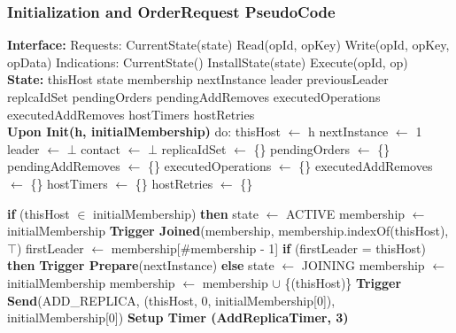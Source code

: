\documentclass[sigconf]{acmart}
\begin{document}
\subsubsection{Initialization and OrderRequest PseudoCode}
\begin{algorithmic}[1]
\small
\State \textbf{Interface:}
\State \quad Requests:
\State \quad \quad CurrentState(state)
\State \quad \quad Read(opId, opKey)
\State \quad \quad Write(opId, opKey, opData)
\State \quad Indications:
\State \quad \quad CurrentState()
\State \quad \quad InstallState(state)
\State \quad \quad Execute(opId, op)\\

\State \textbf{State:}
\State \quad thisHost 
\State \quad state 
\State \quad membership 
\State \quad nextInstance 
\State \quad leader 
\State \quad previousLeader 
\State \quad replcaIdSet 
\State \quad pendingOrders 
\State \quad pendingAddRemoves 
\State \quad executedOperations 
\State \quad executedAddRemoves  
\State \quad hostTimers 
\State \quad hostRetries 
\\


\State \textbf{Upon Init(h, initialMembership)} do:
\State \quad thisHost $\gets$ h
\State \quad nextInstance $\gets$ 1
\State \quad leader $\gets$ $\bot$
\State \quad contact $\gets$ $\bot$
\State \quad replicaIdSet $\gets$ \{\}
\State \quad pendingOrders $\gets$ \{\}
\State \quad pendingAddRemoves $\gets$ \{\}
\State \quad executedOperations $\gets$ \{\}
\State \quad executedAddRemoves $\gets$ \{\}
\State \quad hostTimers $\gets$ \{\}
\State \quad hostRetries $\gets$ \{\}

\State \quad \textbf{if} (thisHost $\in$ initialMembership) \textbf{then}
\State \quad \quad state $\gets$ ACTIVE
\State \quad \quad membership $\gets$ initialMembership
\State \quad \quad \textbf{Trigger Joined}(membership, membership.indexOf(thisHost), $\top$)
\State \quad \quad firstLeader $\gets$ membership[\#membership - 1]
\State \quad \quad \textbf{if} (firstLeader = thisHost) \textbf{then}
\State \quad \quad \quad \textbf{Trigger Prepare}(nextInstance)
\State \quad \textbf{else} 
\State \quad \quad state $\gets$ JOINING
\State \quad \quad membership $\gets$ initialMembership
\State \quad \quad membership $\gets$ membership $\cup$ \{(thisHost)\}
\State \quad \quad \textbf{Trigger Send}(ADD\_REPLICA, (thisHost, 0, initialMembership[0]), initialMembership[0])
\State \quad \quad \textbf{Setup Timer (AddReplicaTimer, 3)} \\


\end{algorithmic}
\end{document}
